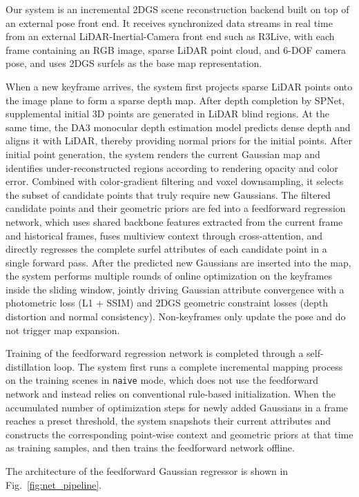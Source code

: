 \documentclass[lettersize,journal]{IEEEtran}
\begin{document}
Our system is an incremental 2DGS scene reconstruction backend built on top of an external pose front end. It receives synchronized data streams in real time from an external LiDAR-Inertial-Camera front end such as R3Live, with each frame containing an RGB image, sparse LiDAR point cloud, and 6-DOF camera pose, and uses 2DGS surfels as the base map representation.

When a new keyframe arrives, the system first projects sparse LiDAR points onto the image plane to form a sparse depth map. After depth completion by SPNet, supplemental initial 3D points are generated in LiDAR blind regions. At the same time, the DA3 monocular depth estimation model predicts dense depth and aligns it with LiDAR, thereby providing normal priors for the initial points. After initial point generation, the system renders the current Gaussian map and identifies under-reconstructed regions according to rendering opacity and color error. Combined with color-gradient filtering and voxel downsampling, it selects the subset of candidate points that truly require new Gaussians. The filtered candidate points and their geometric priors are fed into a feedforward regression network, which uses shared backbone features extracted from the current frame and historical frames, fuses multiview context through cross-attention, and directly regresses the complete surfel attributes of each candidate point in a single forward pass. After the predicted new Gaussians are inserted into the map, the system performs multiple rounds of online optimization on the keyframes inside the sliding window, jointly driving Gaussian attribute convergence with a photometric loss (L1 + SSIM) and 2DGS geometric constraint losses (depth distortion and normal consistency). Non-keyframes only update the pose and do not trigger map expansion.

Training of the feedforward regression network is completed through a self-distillation loop. The system first runs a complete incremental mapping process on the training scenes in \texttt{naive} mode, which does not use the feedforward network and instead relies on conventional rule-based initialization. When the accumulated number of optimization steps for newly added Gaussians in a frame reaches a preset threshold, the system snapshots their current attributes and constructs the corresponding point-wise context and geometric priors at that time as training samples, and then trains the feedforward network offline.

The architecture of the feedforward Gaussian regressor is shown in Fig.~\ref{fig:net_pipeline}.
\end{document}
